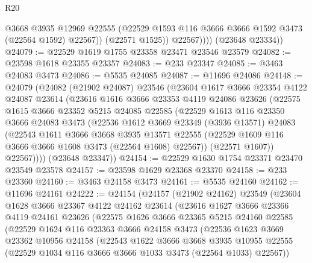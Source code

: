 \begin{lexlean}{R20}
\begin{coremodule}
                  @3668
                  @3935
                  @12969
                  @22555
                  (@22529 @1593 @116 @3666 @3666 @1592 @3473 (@22564 @1592) @22567))
                (@22571 @1525))
              @22567))))
      (@23648 @23334))
@24079 := @22529 @1619 @1755 @23358 @23471 @23546 @23579
@24082 := @23598 @1618 @23355 @23357
@24083 := @233 @23347
@24085 := @3463 @24083 @3473
@24086 := @5535 @24085
@24087 := @11696 @24086
@24148 := @24079
    (@24082
      (@21902 @24087)
      @23546
      (@23604
        @1617
        @3666
        @23354
        @4122
        @24087
        @23614
        (@23616
          @1616
          @3666
          @23353
          @4119
          @24086
          @23626
          (@22575
            @1615
            @3666
            @23352
            @5215
            @24085
            @22585
            (@22529
              @1613
              @116
              @23350
              @3666
              @24083
              @3473
              (@22536
                @1612
                @3669
                @23349
                (@3936 @13571)
                @24083
                (@22543
                  @1611
                  @3666
                  @3668
                  @3935
                  @13571
                  @22555
                  (@22529 @1609 @116 @3666 @3666 @1608 @3473 (@22564 @1608) @22567))
                (@22571 @1607))
              @22567))))
      (@23648 @23347))
@24154 := @22529 @1630 @1754 @23371 @23470 @23549 @23578
@24157 := @23598 @1629 @23368 @23370
@24158 := @233 @23360
@24160 := @3463 @24158 @3473
@24161 := @5535 @24160
@24162 := @11696 @24161
@24222 := @24154
    (@24157
      (@21902 @24162)
      @23549
      (@23604
        @1628
        @3666
        @23367
        @4122
        @24162
        @23614
        (@23616
          @1627
          @3666
          @23366
          @4119
          @24161
          @23626
          (@22575
            @1626
            @3666
            @23365
            @5215
            @24160
            @22585
            (@22529
              @1624
              @116
              @23363
              @3666
              @24158
              @3473
              (@22536
                @1623
                @3669
                @23362
                @10956
                @24158
                (@22543
                  @1622
                  @3666
                  @3668
                  @3935
                  @10955
                  @22555
                  (@22529 @1034 @116 @3666 @3666 @1033 @3473 (@22564 @1033) @22567))

\end{coremodule}
\end{lexlean}
